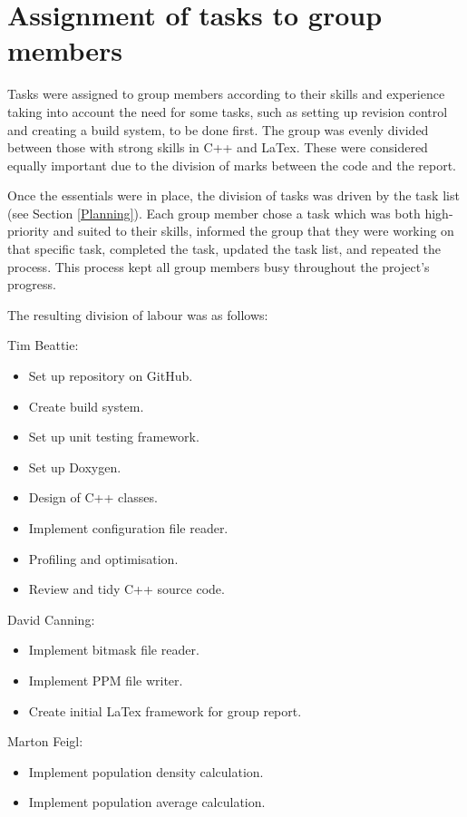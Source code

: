 \section{Assignment of tasks to group members}
\label{Assignment of tasks to group members}

Tasks were assigned to group members according to their skills and experience taking into account the need for some tasks, such as setting up revision control and creating a build system, to be done first.  
The group was evenly divided between those with strong skills in C++ and LaTex.  
These were considered equally important due to the division of marks between the code and the report.

Once the essentials were in place, the division of tasks was driven by the task list (see Section \ref{Planning}).  
Each group member chose a task which was both high-priority and suited to their skills, informed the group that they were working on that specific task, completed the task, updated the task list, and repeated the process.  
This process kept all group members busy throughout the project's progress.

The resulting division of labour was as follows:

Tim Beattie:
\begin{itemize}
	\item Set up repository on GitHub.
	\item Create build system.
	\item Set up unit testing framework.
	\item Set up Doxygen.
	\item Design of C++ classes.
	\item Implement configuration file reader.
	\item Profiling and optimisation.
	\item Review and tidy C++ source code.
\end{itemize}

David Canning:
\begin{itemize}
	\item Implement bitmask file reader.
	\item Implement PPM file writer.
	\item Create initial LaTex framework for group report.
\end{itemize}

Marton Feigl:
\begin{itemize}
	\item Implement population density calculation.
	\item Implement population average calculation.
\end{itemize}

